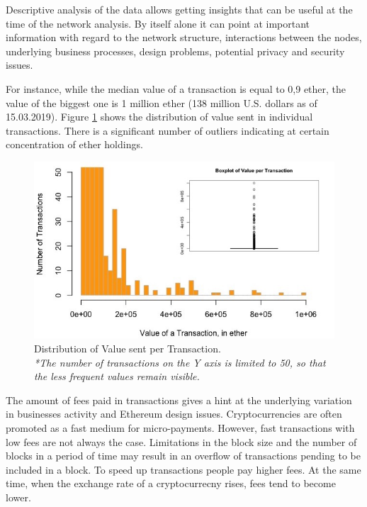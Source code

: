 Descriptive analysis of the data allows getting insights that can be useful at the time of the network analysis.
By itself alone it can point at important information with regard to the network structure, interactions between the nodes, underlying business processes, design problems, potential privacy and security issues.

For instance, while the median value of a transaction is equal to 0,9 ether, the value of the biggest one is 1 million ether (138 million U.S. dollars as of 15.03.2019). 
Figure \ref{fig:value_per_tx} shows the distribution of value sent in individual transactions. 
There is a significant number of outliers indicating at certain concentration of ether holdings.


\begin{figure}[h]
  \centering
  \includegraphics[width=\linewidth]{figures/value_per_tx.jpeg}
  \caption{Distribution of Value sent per Transaction.\\ 
  \textit{*The number of transactions on the Y axis is limited to 50, so that the less frequent values remain visible.}}
  \label{fig:value_per_tx}
\end{figure}

The amount of fees paid in transactions gives a hint at the underlying variation in businesses activity and Ethereum design issues. 
Cryptocurrencies are often promoted as a fast medium for micro-payments. 
However, fast transactions with low fees are not always the case.
Limitations in the block size and the number of blocks in a period of time may result in an overflow of transactions pending to be included in a block.
To speed up transactions people pay higher fees.
At the same time, when the exchange rate of a cryptocurrecny rises, fees tend to become lower.

